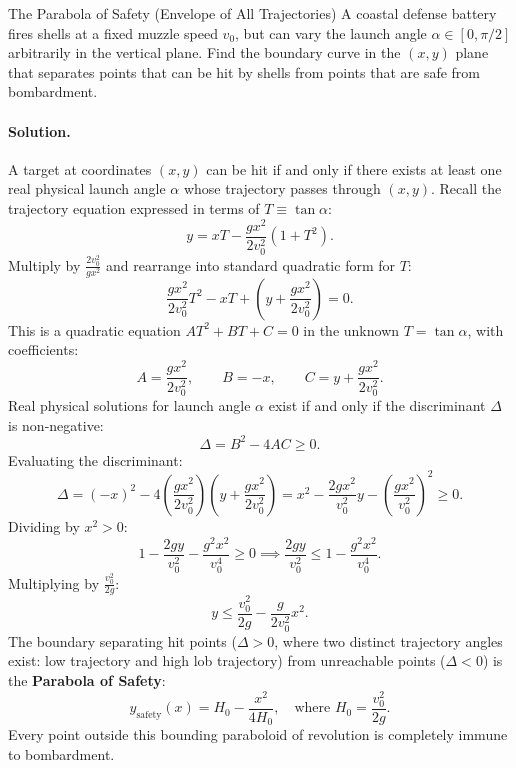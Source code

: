 \begin{workedexample}{The Parabola of Safety (Envelope of All Trajectories)}
A coastal defense battery fires shells at a fixed muzzle speed $v_0$, but can vary the launch angle $\alpha \in [0, \pi/2]$ arbitrarily in the vertical plane.
Find the boundary curve in the $(x, y)$ plane that separates points that can be hit by shells from points that are safe from bombardment.

\paragraph{Solution.}

A target at coordinates $(x, y)$ can be hit if and only if there exists at least one real physical launch angle $\alpha$ whose trajectory passes through $(x, y)$.
Recall the trajectory equation expressed in terms of $T \equiv \tan\alpha$:
\[
y = x T - \frac{gx^2}{2v_0^2}(1 + T^2).
\]
Multiply by $\frac{2v_0^2}{gx^2}$ and rearrange into standard quadratic form for $T$:
\[
\frac{gx^2}{2v_0^2}T^2 - x T + \left(y + \frac{gx^2}{2v_0^2}\right) = 0.
\]
This is a quadratic equation $A T^2 + B T + C = 0$ in the unknown $T = \tan\alpha$, with coefficients:
\[
A = \frac{gx^2}{2v_0^2}, \qquad B = -x, \qquad C = y + \frac{gx^2}{2v_0^2}.
\]
Real physical solutions for launch angle $\alpha$ exist if and only if the discriminant $\Delta$ is non-negative:
\[
\Delta = B^2 - 4AC \ge 0.
\]
Evaluating the discriminant:
\[
\Delta = (-x)^2 - 4\left(\frac{gx^2}{2v_0^2}\right)\left(y + \frac{gx^2}{2v_0^2}\right) = x^2 - \frac{2gx^2}{v_0^2}y - \left(\frac{gx^2}{v_0^2}\right)^2 \ge 0.
\]
Dividing by $x^2 > 0$:
\[
1 - \frac{2gy}{v_0^2} - \frac{g^2 x^2}{v_0^4} \ge 0 \implies \frac{2gy}{v_0^2} \le 1 - \frac{g^2 x^2}{v_0^4}.
\]
Multiplying by $\frac{v_0^2}{2g}$:
\[
\boxed{y \le \frac{v_0^2}{2g} - \frac{g}{2v_0^2}x^2.}
\]
The boundary separating hit points ($\Delta > 0$, where two distinct trajectory angles exist: low trajectory and high lob trajectory) from unreachable points ($\Delta < 0$) is the \textbf{Parabola of Safety}:
\[
\boxed{y_{\text{safety}}(x) = H_0 - \frac{x^2}{4H_0}, \quad \text{where } H_0 = \frac{v_0^2}{2g}.}
\]
Every point outside this bounding paraboloid of revolution is completely immune to bombardment.
\end{workedexample}

